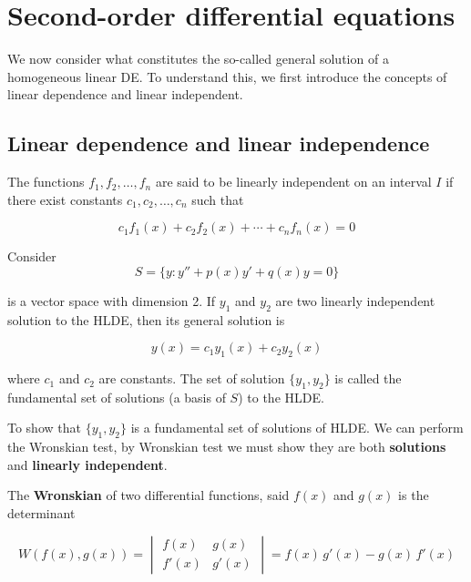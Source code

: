 \chapter{Second-order differential equations}

We now consider what constitutes the so-called general solution of a homogeneous linear DE. To understand this, 
we first introduce the concepts of linear dependence and linear independent.

\section{Linear dependence and linear independence}

\begin{definition}
    The functions $f_1, f_2, \ldots, f_n$ are said to be linearly independent on an interval $I$ if there 
    exist constants $c_1, c_2, \ldots, c_n$ such that 

    \begin{equation}
        c_1 f_1(x) + c_2 f_2(x) + \cdots + c_n f_n(x) = 0
    \end{equation}
\end{definition}

Consider 
\begin{equation}
    S = \{ y : y'' + p(x)y' + q(x)y = 0 \}
\end{equation}

is a vector space with dimension 2. If $y_1$ and $y_2$ are two linearly 
independent solution to the HLDE, then its general solution is 

\begin{equation}
    y(x) = c_1 y_1(x) + c_2 y_2(x)
\end{equation}

where $c_1$ and $c_2$ are constants. The set of solution $\{y_1, y_2 \}$ is 
called the fundamental set of  solutions (a basis of $S$) to the HLDE.

To show that $\{y_1, y_2 \}$ is a fundamental set of solutions of HLDE. We can perform the Wronskian test, 
by Wronskian test we must show they are both \textbf{solutions} and \textbf{linearly independent}.

\begin{definition}[Wronskian]
    The \textbf{Wronskian} of two differential functions, said $f(x)$ and $g(x)$ 
    is the determinant

    \begin{equation}
        W(f(x), g(x)) = \begin{vmatrix}
            f(x) & g(x)\\ f'(x) & g'(x) 
        \end{vmatrix} = f(x)\,g'(x) - g(x)\, f'(x)
    \end{equation}
\end{definition}

